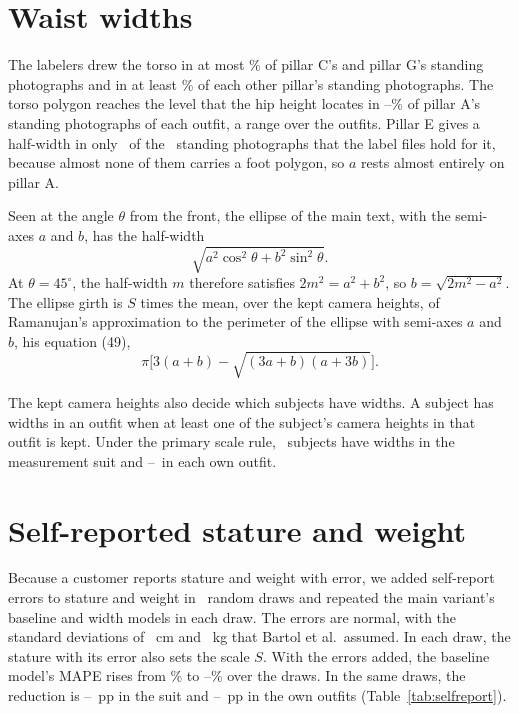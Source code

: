 \documentclass[12pt]{article}
\begin{document}
\section{Waist widths}\label{sec:widths}

The labelers drew the torso in at most \torsoSideMax\% of pillar C's and pillar G's standing photographs and in at
least \torsoOtherMin\% of each other pillar's standing photographs. The torso polygon reaches the level that the hip height
locates in \hipShareMin--\hipShareMax\% of pillar A's standing photographs of each outfit, a range over the outfits. Pillar E gives a half-width in only \footImagesE\ of the \imagesE\
standing photographs that the label files hold for it, because almost none of them carries a foot polygon, so $a$ rests almost entirely on pillar A.

Seen at the angle $\theta$ from the front, the ellipse of the main text, with the semi-axes $a$ and $b$, has the
half-width
\begin{equation}
\sqrt{a^2\cos^2\theta + b^2\sin^2\theta}.
\end{equation}
At $\theta = 45^\circ$, the
half-width $m$ therefore satisfies $2m^2 = a^2 + b^2$, so $b = \sqrt{2m^2 - a^2}$. The ellipse girth is $S$ times
the mean, over the kept camera heights, of Ramanujan's approximation to the perimeter of the ellipse with semi-axes $a$ and $b$, his equation (49),\cite{ramanujan1914}
\begin{equation}
\pi\bigl[3(a + b) - \sqrt{(3a + b)(a + 3b)}\bigr].
\end{equation}


The kept camera heights also decide which subjects have widths. A subject has widths in an outfit when at least one of the subject's camera heights in that outfit is kept. Under the
primary scale rule, \nSuitSubjects\ subjects have widths in the measurement suit and
\nOwnSubjectsMin--\nOwnSubjectsMax\ in each own outfit.

\section{Self-reported stature and weight}\label{sec:selfreport}

Because a customer reports stature and weight with error, we added self-report errors to stature and weight in
\nDraws\ random draws and repeated the main variant's baseline and width models in each draw. The errors are
normal, with the standard deviations of \selfReportSdCm~cm and \selfReportSdKg~kg that Bartol et al.\
assumed.\cite{bartol2022} In each draw, the stature with its error also sets the scale $S$. With the errors added, the
baseline model's MAPE rises from \mapeBaseline\% to \selfBaseMin--\selfBaseMax\% over the draws. In the same
draws, the reduction is \selfRedSuitMin--\selfRedSuitMax~pp in the suit and
\selfRedOwnMin--\selfRedOwnMax~pp in the own outfits (Table~\ref{tab:selfreport}).
\end{document}
